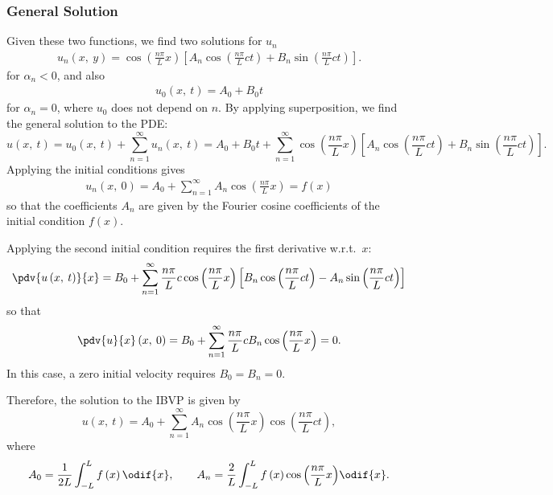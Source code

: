 \documentclass{article}
\begin{document}
\subsubsection{General Solution}
Given these two functions, we find two solutions for \(u_n\)
\begin{align*}
    u_n\left( x,\: y \right) = \cos{\left( \frac{n \pi}{L} x \right)} \left[ A_n \cos{\left( \frac{n \pi}{L} c t \right)} + B_n \sin{\left( \frac{n \pi}{L} c t \right)} \right].
\end{align*}
for \(\alpha_n < 0\), and also
\begin{align*}
    u_0\left( x,\: t \right) = A_0 + B_0 t
\end{align*}
for \(\alpha_n = 0\), where \(u_0\) does not depend on \(n\).
By applying superposition, we find the general solution to the PDE\@:
\begin{equation*}
    u\left( x,\: t \right) = u_0\left( x,\: t \right) + \sum_{n = 1}^\infty u_n\left( x,\: t \right) = A_0 + B_0 t + \sum_{n = 1}^\infty \cos{\left( \frac{n \pi}{L} x \right)} \left[ A_n \cos{\left( \frac{n \pi}{L} c t \right)} + B_n \sin{\left( \frac{n \pi}{L} c t \right)} \right].
\end{equation*}
Applying the initial conditions gives
\begin{align*}
    u_n\left( x,\: 0 \right) = A_0 + \sum_{n = 1}^\infty A_n \cos{\left( \frac{n \pi}{L} x \right)} = f\left( x \right)
\end{align*}
so that the coefficients \(A_n\) are given by the Fourier cosine coefficients of the initial condition \(f\left( x \right)\).

Applying the second initial condition requires the first derivative w.r.t.\ \(x\):
\begin{equation*}
    \pdv{u\left( x,\: t \right)}{x} = B_0 + \sum_{n = 1}^\infty \frac{n \pi}{L} c \cos{\left( \frac{n \pi}{L} x \right)} \left[ B_n \cos{\left( \frac{n \pi}{L} c t \right)} - A_n \sin{\left( \frac{n \pi}{L} c t \right)} \right]
\end{equation*}
so that
\begin{equation*}
    \pdv{u}{x}\left( x,\: 0 \right) = B_0 + \sum_{n = 1}^\infty \frac{n \pi}{L} c B_n \cos{\left( \frac{n \pi}{L} x \right)} = 0.
\end{equation*}
In this case, a zero initial velocity requires \(B_0 = B_n = 0\).

Therefore, the solution to the IBVP is given by
\begin{equation*}
    u\left( x,\: t \right) = A_0 + \sum_{n = 1}^\infty A_n \cos{\left( \frac{n \pi}{L} x \right)} \cos{\left( \frac{n \pi}{L} c t \right)},
\end{equation*}
where
\begin{equation*}
    A_0 = \frac{1}{2L} \int_{-L}^L f\left( x \right) \odif{x}, \quad\quad A_n = \frac{2}{L} \int_{-L}^{L} f\left( x \right) \cos{\left( \frac{n \pi}{L} x \right)} \odif{x}.
\end{equation*}
\end{document}
